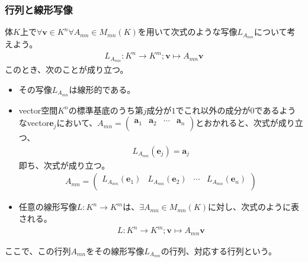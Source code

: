 \documentclass[dvipdfmx]{jsarticle}
\begin{document}
\subsubsection{行列と線形写像}%
\begin{thm}\label{2.1.4.7}
体$K$上で$\forall\mathbf{v} \in K^{n}\forall A_{mn} \in M_{mn}(K)$を用いて次式のような写像$L_{A_{mn}}$について考えよう。
\begin{align*}
L_{A_{mn}}:K^{n} \rightarrow K^{m};\mathbf{v} \mapsto A_{mn}\mathbf{v}
\end{align*}
このとき、次のことが成り立つ。
\begin{itemize}
\item
  その写像$L_{A_{mn}}$は線形的である。
\item
  vector空間$K^{n}$の標準基底のうち第$j$成分が$1$でこれ以外の成分が$0$であるようなvector$\mathbf{e}_{j}$において、$A_{mn} = \begin{pmatrix}
  \mathbf{a}_{1} & \mathbf{a}_{2} & \cdots & \mathbf{a}_{n} \\
  \end{pmatrix}$とおかれると、次式が成り立つ、
\begin{align*}
L_{A_{mn}}\left( \mathbf{e}_{j} \right) = \mathbf{a}_{j}
\end{align*}
即ち、次式が成り立つ。
\begin{align*}
A_{mn} = \begin{pmatrix}
L_{A_{mn}}\left( \mathbf{e}_{1} \right) & L_{A_{mn}}\left( \mathbf{e}_{2} \right) & \cdots & L_{A_{mn}}\left( \mathbf{e}_{n} \right) \\
\end{pmatrix}
\end{align*}
\item
  任意の線形写像$L:K^{n} \rightarrow K^{m}$は、$\exists A_{mn} \in M_{mn}(K)$に対し、次式のように表される。
\begin{align*}
L:K^{n} \rightarrow K^{m};\mathbf{v} \mapsto A_{mn}\mathbf{v}
\end{align*}
\end{itemize}
\end{thm}
\begin{dfn}
ここで、この行列$A_{mn}$をその線形写像$L_{A_{mn}}$の行列、対応する行列という。
\end{dfn}
\end{document}
